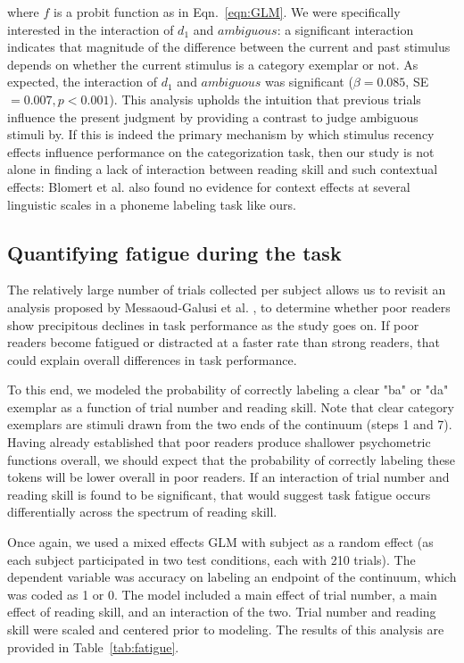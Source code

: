 \documentclass[../uwthesis.tex]{subfiles}
\begin{document}
where $f$ is a probit function as in Eqn.~\ref{eqn:GLM}. We were specifically interested in the interaction of $d_1$ and $ambiguous$: a significant interaction indicates that magnitude of the difference between the current and past stimulus depends on whether the current stimulus is a category exemplar or not. As expected, the interaction of $d_1$ and $ambiguous$ was significant ($\beta=0.085$, SE $=0.007,p<0.001$). This analysis upholds the intuition that previous trials influence the present judgment by providing a contrast to judge ambiguous stimuli by. If this is indeed the primary mechanism by which stimulus recency effects influence performance on the categorization task, then our study is not alone in finding a lack of interaction between reading skill and such contextual effects: Blomert et al. \citep{Blomert2004} also found no evidence for context effects at several linguistic scales in a phoneme labeling task like ours.


\subsection{Quantifying fatigue during the task}
The relatively large number of trials collected per subject allows us to revisit an analysis proposed by Messaoud-Galusi et al. \citep{Messaoud-Galusi2011}, to determine whether poor readers show precipitous declines in task performance as the study goes on. If poor readers become fatigued or distracted at a faster rate than strong readers, that could explain overall differences in task performance. 

To this end, we modeled the probability of correctly labeling a clear "ba" or "da" exemplar as a function of trial number and reading skill. Note that clear category exemplars are stimuli drawn from the two ends of the continuum (steps 1 and 7). Having already established that poor readers produce shallower psychometric functions overall, we should expect that the probability of correctly labeling these tokens will be lower overall in poor readers. If an interaction of trial number and reading skill is found to be significant, that would suggest task fatigue occurs differentially across the spectrum of reading skill. 

Once again, we used a mixed effects GLM with subject as a random effect (as each subject participated in two test conditions, each with 210 trials). The dependent variable was accuracy on labeling an endpoint of the continuum, which was coded as 1 or 0. The model included a main effect of trial number, a main effect of reading skill, and an interaction of the two. Trial number and reading skill were scaled and centered prior to modeling. The results of this analysis are provided in Table~\ref{tab:fatigue}.
\end{document}
